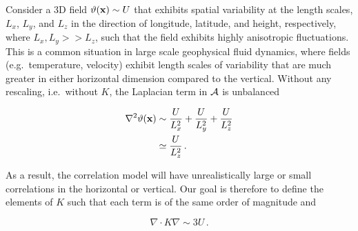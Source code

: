 Consider a 3D field $\vartheta(\mathbf{x})\sim U$ that exhibits spatial variability at the
length scales, $L_x$, $L_y$, and $L_z$ in the direction of longitude, latitude,
and height, respectively,
where $L_x, L_y >> L_z$, such that the field exhibits highly
anisotropic fluctuations.
This is a common situation in large scale geophysical fluid
dynamics, where fields (e.g.\ temperature, velocity) exhibit length scales of
variability that are much greater in either horizontal dimension compared to the
vertical.
Without any rescaling, i.e.\ without $K$,
the Laplacian term in $\mathcal{A}$ is unbalanced
\begin{linenomath*}\begin{equation}
    \begin{aligned}
        \nabla^2 \vartheta(\mathbf{x})
            & \sim \dfrac{U}{L_x^2} + \dfrac{U}{L_y^2} + \dfrac{U}{L_z^2} \\
            & \simeq \dfrac{U}{L_z^2} \, .
    \end{aligned}
    \label{eq:iso_lap}
\end{equation}\end{linenomath*}
As a result, the correlation model will
have unrealistically large or small correlations in the horizontal or vertical.
Our goal is therefore to define the elements of $K$ such that each term is of
the same order of magnitude and
\begin{linenomath*}\begin{equation*}
    \nabla\cdot K\nabla \sim 3U \, .
\end{equation*}\end{linenomath*}

